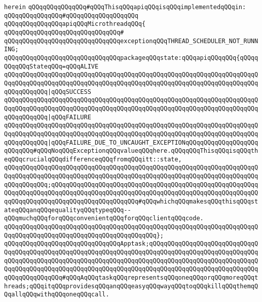 \verb|herein|\newline
\newline
\verb|qQQqqQQqqQQqqQQq#qQQqThisqQQqapiqQQqisqQQqimplementedqQQqin:|\newline
\verb|qQQqqQQqqQQqqQQq#qQQqqQQqqQQqqQQqqQQq|\newline
\newline
\verb|qQQqqQQqqQQqqQQqapiqQQqMicrothreadqQQq{|\newline
\verb|qQQqqQQqqQQqqQQqqQQqqQQqqQQqqQQq#|\newline
\verb|qQQqqQQqqQQqqQQqqQQqqQQqqQQqqQQqexceptionqQQqTHREAD_SCHEDULER_NOT_RUNNING;|\newline
\newline
\verb|qQQqqQQqqQQqqQQqqQQqqQQqqQQqqQQqpackageqQQqstate:qQQqapiqQQqqQQq{qQQqqQQqqQQqStateqQQq=qQQqALIVE|\newline
\verb|qQQqqQQqqQQqqQQqqQQqqQQqqQQqqQQqqQQqqQQqqQQqqQQqqQQqqQQqqQQqqQQqqQQqqQQqqQQqqQQqqQQqqQQqqQQqqQQqqQQqqQQqqQQqqQQqqQQqqQQqqQQqqQQqqQQqqQQqqQQqqQQqqQQqqQQq|\verb#|qQQqSUCCESS#\newline
\verb|qQQqqQQqqQQqqQQqqQQqqQQqqQQqqQQqqQQqqQQqqQQqqQQqqQQqqQQqqQQqqQQqqQQqqQQqqQQqqQQqqQQqqQQqqQQqqQQqqQQqqQQqqQQqqQQqqQQqqQQqqQQqqQQqqQQqqQQqqQQqqQQqqQQqqQQq|\verb#|qQQqFAILURE#\newline
\verb|qQQqqQQqqQQqqQQqqQQqqQQqqQQqqQQqqQQqqQQqqQQqqQQqqQQqqQQqqQQqqQQqqQQqqQQqqQQqqQQqqQQqqQQqqQQqqQQqqQQqqQQqqQQqqQQqqQQqqQQqqQQqqQQqqQQqqQQqqQQqqQQqqQQqqQQq|\verb#|qQQqFAILURE_DUE_TO_UNCAUGHT_EXCEPTIONqQQqqQQqqQQqqQQqqQQqqQQqqQQq#\verb|#qQQqNoqQQqExceptionqQQqvalueqQQqhere.qQQqqQQqThisqQQqisqQQqtheqQQqcrucialqQQqdifferenceqQQqfromqQQqitt::state,|\newline
\verb|qQQqqQQqqQQqqQQqqQQqqQQqqQQqqQQqqQQqqQQqqQQqqQQqqQQqqQQqqQQqqQQqqQQqqQQqqQQqqQQqqQQqqQQqqQQqqQQqqQQqqQQqqQQqqQQqqQQqqQQqqQQqqQQqqQQqqQQqqQQqqQQqqQQqqQQq;qQQqqQQqqQQqqQQqqQQqqQQqqQQqqQQqqQQqqQQqqQQqqQQqqQQqqQQqqQQqqQQqqQQqqQQqqQQqqQQqqQQqqQQqqQQqqQQqqQQqqQQqqQQqqQQqqQQqqQQqqQQqqQQqqQQqqQQqqQQqqQQqqQQqqQQqqQQqqQQqqQQq#qQQqwhichqQQqmakesqQQqthisqQQqstateqQQqanqQQqequalityqQQqtypeqQQq--qQQqmuchqQQqforqQQqconvenientqQQqforqQQqclientqQQqcode.|\newline
\verb|qQQqqQQqqQQqqQQqqQQqqQQqqQQqqQQqqQQqqQQqqQQqqQQqqQQqqQQqqQQqqQQqqQQqqQQqqQQqqQQqqQQqqQQqqQQqqQQqqQQqqQQqqQQqqQQq};|\newline
\newline
\verb|qQQqqQQqqQQqqQQqqQQqqQQqqQQqqQQqApptask;qQQqqQQqqQQqqQQqqQQqqQQqqQQqqQQqqQQqqQQqqQQqqQQqqQQqqQQqqQQqqQQqqQQqqQQqqQQqqQQqqQQqqQQqqQQqqQQqqQQqqQQqqQQqqQQqqQQqqQQqqQQqqQQqqQQqqQQqqQQqqQQqqQQqqQQqqQQqqQQqqQQqqQQqqQQqqQQqqQQqqQQqqQQqqQQqqQQqqQQqqQQqqQQqqQQqqQQqqQQqqQQqqQQqqQQqqQQqqQQqqQQqqQQqqQQqqQQq#qQQqAqQQqtaskqQQqrepresentsqQQqoneqQQqorqQQqmoreqQQqthreads;qQQqitqQQqprovidesqQQqanqQQqeasyqQQqwayqQQqtoqQQqkillqQQqthemqQQqallqQQqwithqQQqoneqQQqcall.|\newline
